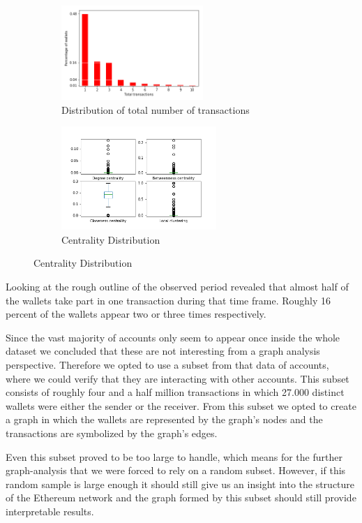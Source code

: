 \begin{figure}[t]
\centering
\begin{subfigure}[b]{0.5\textwidth}
\centering
\includegraphics[height=135px]{../pics/distribution.png}
\caption{Distribution of total number of transactions}
\end{subfigure}%
\begin{subfigure}[b]{0.5\textwidth}
\centering
\includegraphics[height=148px]{../analysis/centrality.png}
\caption{Centrality Distribution}
\label{centralitydist}
\end{subfigure}
\end{figure}

Looking at the rough outline of the observed period revealed that almost half of the wallets take part in one transaction during that time frame.
Roughly 16 percent of the wallets appear two or three times respectively.

Since the vast majority of accounts only seem to appear once inside the whole dataset we concluded that these are not interesting from a graph analysis perspective. 
Therefore we opted to use a subset from that data of accounts, where we could verify that they are interacting with other accounts. 
This subset consists of roughly four and a half million transactions in which 27.000 distinct wallets were either the sender or the receiver. 
From this subset we opted to create a graph in which the wallets are represented by the graph's nodes and the transactions are symbolized by the graph's edges.

Even this subset proved to be too large to handle, which means for the further graph-analysis that we were forced to rely on a random subset. 
However, if this random sample is large enough it should still give us an insight into the structure of the Ethereum network and the graph formed by this subset should still provide interpretable results.

